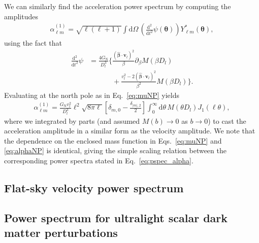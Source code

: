 \documentclass[prd,aps,10pt,nofootinbib,twocolumn,superscriptaddress,preprintnumbers,balancelastpage,longbibliography]{revtex4-1}
\newcommand{\vect}[1]{\boldsymbol{\mathbf{#1}}}
\newcommand{\dd}{\mathrm{d}}
\newcommand{\ellm}{{\ell m}}
\newcommand{\GN}{G_\mathrm{N}}
\begin{document}
We can similarly find the acceleration power spectrum by computing the amplitudes
\begin{align}
\alpha_{\ell m}^{(1)} = \sqrt{\ell(\ell+1)}\int \dd\Omega\, \left(\frac{\dd^2}{\dd t^2} \psi(\vect{\theta})\right) Y_{\ellm}^*(\vect{\theta}), \label{eq:alphaperlens1}
\end{align}
using the fact that
\begin{align}
\frac{\dd^2}{\dd t^2} \psi &= \frac{4\GN}{D_l^3} \bigg\lbrace\frac{(\hat{\vect{\beta}} \cdot {\vect{v}}_l)^2}{\beta}  \partial_\beta M(\beta D_l) \\
&\phantom{=\frac{4\GN}{D_l^3} \bigg\lbrace} + \frac{v_l^2 - 2 (\hat{\vect{\beta}} \cdot {\vect{v}}_l)^2 }{\beta^2}M(\beta D_l)\bigg\rbrace. \nonumber
\end{align}
Evaluating at the north pole as in Eq.~\ref{eq:muNP} yields
\begin{align}
\alpha_{\ell m}^{(1)}  = \frac{\GN v_l^2}{D_l^3} \ell^2 \sqrt{8\pi \ell}\left[\delta_{m,0}-\frac{\delta_{|m|,2}}{2} \right]\int_0^\infty \dd \theta \, M(\theta D_l) J_1(\ell \theta),\label{eq:alphaNP}
\end{align}
where we integrated by parts (and assumed $M(b)\to 0$ as $b\to 0$) to cast the acceleration amplitude in a similar form as the velocity amplitude. We note that the dependence on the enclosed mass function in Eqs.~\ref{eq:muNP} and \ref{eq:alphaNP} is identical, giving the simple scaling relation between the corresponding power spectra stated in Eq.~\ref{eq:pspec_alpha}.

\subsection{Flat-sky velocity power spectrum}

\subsection{Power spectrum for ultralight scalar dark matter perturbations}
\end{document}
